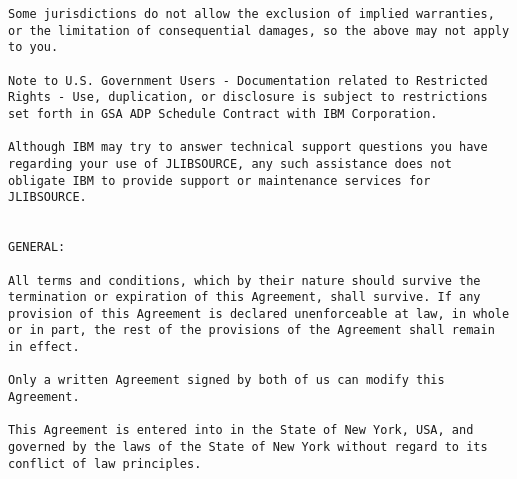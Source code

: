 \begin{verbatim}
Some jurisdictions do not allow the exclusion of implied warranties,
or the limitation of consequential damages, so the above may not apply
to you.

Note to U.S. Government Users - Documentation related to Restricted
Rights - Use, duplication, or disclosure is subject to restrictions
set forth in GSA ADP Schedule Contract with IBM Corporation.

Although IBM may try to answer technical support questions you have
regarding your use of JLIBSOURCE, any such assistance does not
obligate IBM to provide support or maintenance services for
JLIBSOURCE.


GENERAL: 

All terms and conditions, which by their nature should survive the
termination or expiration of this Agreement, shall survive. If any
provision of this Agreement is declared unenforceable at law, in whole
or in part, the rest of the provisions of the Agreement shall remain
in effect.

Only a written Agreement signed by both of us can modify this Agreement. 

This Agreement is entered into in the State of New York, USA, and
governed by the laws of the State of New York without regard to its
conflict of law principles.

\end{verbatim}
